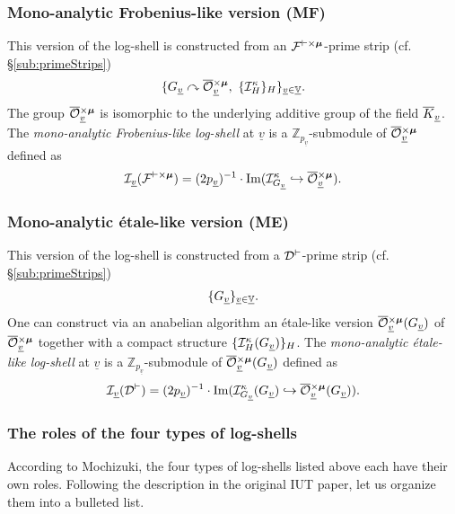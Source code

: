 \documentclass[12pt, reqno, a4paper]{amsart}
\def\udl#1{\underline{#1}} %
\def\acton{\curvearrowright} %
\def\injto{\hookrightarrow}
\def\bZ{\mathbb{Z}} %
\def\bV{\mathbb{V}}
\def\uV{\udl{\bV}} %
\def\uv{\udl{v}} %
\DeclareMathOperator{\Image}{Im}
\begin{document}
\subsubsection{Mono-analytic Frobenius-like version (MF)}\label{subsub:MF}
This version of the log-shell is constructed from an $\cFvxmu$-prime strip (cf. \S\ref{sub:primeStrips})
$$
\{\GG_{\uv}\acton\oOOxmu_{\uv},\ \{\LS^{\kappa}_H\}_H\}_{\uv\in \uV}.
$$
The group $\oOOxmu_{\uv}$ is isomorphic to the underlying additive group of the field $\oK_{\uv}$.
The \emph{mono-analytic Frobenius-like log-shell} at $\uv$ is a $\bZ_{p_{\uv}}$-submodule of $\oOOxmu_{\uv}$ defined as
$$
\LS_{\uv}(\cFvxmu)=(2p_{\uv})^{-1}\cdot\Image(\LS^{\kappa}_{\GG_{\uv}}\injto\oOOxmu_{\uv}).
$$

\subsubsection{Mono-analytic \'etale-like version (ME)}\label{subsub:ME}
This version of the log-shell is constructed from a $\cDv$-prime strip (cf. \S\ref{sub:primeStrips})
$$
\{\GG_{\uv}\}_{\uv\in \uV}.
$$
One can construct via an anabelian algorithm an \'etale-like version $\oOOxmu_{\uv}(\GG_{\uv})$ of $\oOOxmu_{\uv}$ together with a compact structure $\{\LS^\kappa_H(\GG_{\uv})\}_H$.
The \emph{mono-analytic \'etale-like log-shell} at $\uv$ is a $\bZ_{p_{\uv}}$-submodule of $\oOOxmu_{\uv}(\GG_{\uv})$ defined as
$$
\LS_{\uv}(\cDv)=(2p_{\uv})^{-1}\cdot\Image(\LS^\kappa_{\GG_{\uv}}(\GG_{\uv})\injto\oOOxmu_{\uv}(\GG_{\uv})).
$$


\subsubsection{The roles of the four types of log-shells}\label{subsub:fourLogShellRoles}
According to Mochizuki, the four types of log-shells listed above each have their own roles. Following the description in the original IUT paper, let us organize them into a bulleted list.
\end{document}
